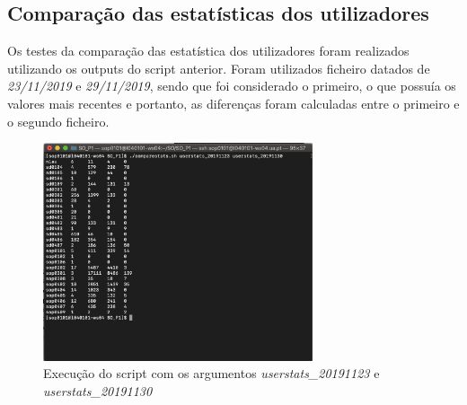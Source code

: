 \documentclass[10pt,portuguese]{article}
\begin{document}
\subsection{Comparação das estatísticas dos utilizadores}
Os testes da comparação das estatística dos utilizadores foram realizados utilizando os outputs do script anterior. Foram utilizados ficheiro datados de \textit{23/11/2019} e \textit{29/11/2019}, sendo que foi considerado o primeiro, o que possuía os valores mais recentes e portanto, as diferenças foram calculadas entre o primeiro e o segundo ficheiro.
\begin{figure}[!h]
    \centering
    \includegraphics[width=300]{Resultados/normal_c.png}
    \caption{Execução do script com os argumentos \textit{userstats\_20191123} e \textit{userstats\_20191130}}
\end{figure}
\end{document}
